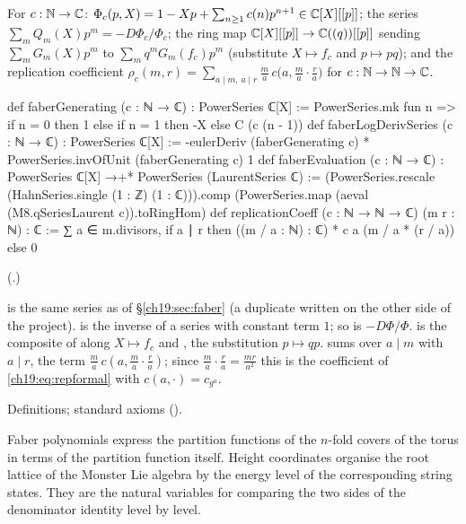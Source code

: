 \begin{definition}\label{ch19:def:faberheight}
For $c:{\mathbb{N}}\to{\mathbb{C}}$: $\Phi_c(p,X)=1-Xp+\sum_{n\ge1}c(n)p^{n+1}\in{\mathbb{C}}[X][[p]]$; the series $\sum_mQ_m(X)p^m=-D\Phi_c/\Phi_c$; the ring map
${\mathbb{C}}[X][[p]]\to{\mathbb{C}}((q))[[p]]$ sending $\sum_mG_m(X)p^m$ to $\sum_mq^mG_m(f_c)p^m$ (substitute $X\mapsto f_c$ and $p\mapsto pq$); and the
replication coefficient $\rho_c(m,r)=\sum_{a\mid m,\ a\mid r}\frac ma\,c\bigl(a,\frac ma\cdot\frac ra\bigr)$ for $c:{\mathbb{N}}\to{\mathbb{N}}\to{\mathbb{C}}$.
\end{definition}
\begin{leancode}
def faberGenerating (c : ℕ → ℂ) : PowerSeries ℂ[X] :=
  PowerSeries.mk fun n => if n = 0 then 1 else if n = 1 then -X else C (c (n - 1))
def faberLogDerivSeries (c : ℕ → ℂ) : PowerSeries ℂ[X] :=
  -eulerDeriv (faberGenerating c) * PowerSeries.invOfUnit (faberGenerating c) 1
def faberEvaluation (c : ℕ → ℂ) : PowerSeries ℂ[X] →+* PowerSeries (LaurentSeries ℂ) :=
  (PowerSeries.rescale (HahnSeries.single (1 : ℤ) (1 : ℂ))).comp
    (PowerSeries.map (aeval (M8.qSeriesLaurent c)).toRingHom)
def replicationCoeff (c : ℕ → ℕ → ℂ) (m r : ℕ) : ℂ :=
  ∑ a ∈ m.divisors, if a ∣ r then ((m / a : ℕ) : ℂ) * c a (m / a * (r / a)) else 0
\end{leancode}
(.)
\begin{dictionary}
 is the same series as  of \S\ref{ch19:sec:faber} (a duplicate written on the other
side of the project).   is the inverse of a series with
constant term $1$; so  is $-D\Phi/\Phi$.   is the composite of
 along $X\mapsto f_c$ and , the substitution $p\mapsto qp$.
 sums over $a\mid m$ with $a\mid r$, the term $\frac ma\,c(a,\frac ma\cdot\frac ra)$; since
$\frac ma\cdot\frac ra=\frac{mr}{a^2}$ this is the coefficient of \eqref{ch19:eq:repformal} with $c(a,\cdot)=c_{g^a}$.
\end{dictionary}
\begin{status}Definitions; standard axioms ().\end{status}

\begin{physics}
Faber polynomials express the partition functions of the $n$-fold covers of the torus in terms of the partition
function itself. Height coordinates organise the root lattice of the Monster Lie algebra by the energy level of the
corresponding string states. They are the natural variables for comparing the two sides of the denominator identity
level by level.
\end{physics}

